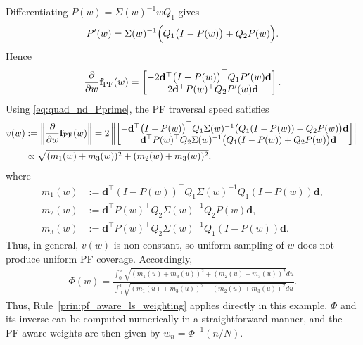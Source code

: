 \documentclass{article}
\newcommand{\bd}{\mathbf{d}}
\newcommand{\f}{\mathbf{f}}
\newcommand{\Farc}{\Phi}
\begin{document}
Differentiating $P(w)=\Sigma(w)^{-1}wQ_1$ gives
\begin{align}
P'(w)
=
\Sigma(w)^{-1}\Bigl(Q_1\bigl(I-P(w)\bigr)+Q_2P(w)\Bigr).
\label{eq:quad_nd_Pprime}
\end{align}
Hence
\begin{align}
\frac{\partial}{\partial w}\f_{\rm PF}(w)
=
\begin{bmatrix}
-2 \bd^\top \bigl(I-P(w)\bigr)^\top Q_1 P'(w)\bd\\
\phantom{-}2 \bd^\top P(w)^\top Q_2 P'(w)\bd
\end{bmatrix}.
\end{align}
Using \eqref{eq:quad_nd_Pprime}, the PF traversal speed satisfies
\begin{align}
v(w)
&:=
\left\|
\frac{\partial}{\partial w}\f_{\rm PF}(w)
\right\| =
2\left\|
\begin{bmatrix}
-\bd^\top \bigl(I-P(w)\bigr)^\top Q_1 \Sigma(w)^{-1}\bigl(Q_1(I-P(w))+Q_2P(w)\bigr)\bd\\
\phantom{-}\bd^\top P(w)^\top Q_2 \Sigma(w)^{-1}\bigl(Q_1(I-P(w))+Q_2P(w)\bigr)\bd
\end{bmatrix}
\right\| \nonumber\\
&\propto
\sqrt{(m_1(w)+m_3(w))^2+(m_2(w)+m_3(w))^2},
\label{eq:quad_nd_speed}
\end{align}
where
\begin{align*}
m_1(w)&:=\bd^\top (I-P(w))^\top Q_1\Sigma(w)^{-1}Q_1(I-P(w))\bd,\\
m_2(w)&:=\bd^\top P(w)^\top Q_2\Sigma(w)^{-1}Q_2P(w)\bd,\\
m_3(w)&:=%
\bd^\top P(w)^\top Q_2\Sigma(w)^{-1}Q_1(I-P(w))\bd .
\end{align*}
Thus, in general, $v(w)$ is non-constant, so uniform sampling of $w$ does not produce uniform PF coverage. Accordingly,
\begin{align}
\Farc(w)=
\frac{\int_0^w \sqrt{(m_1(u)+m_3(u))^2+(m_2(u)+m_3(u))^2} du}
{\int_0^1 \sqrt{(m_1(u)+m_3(u))^2+(m_2(u)+m_3(u))^2} du}.
\end{align}
Thus, Rule~\ref{prin:pf_aware_ls_weighting} applies directly in this example. $\Farc$ and its inverse can be computed numerically in a straightforward manner, and the PF-aware weights are then given by $w_n=\Farc^{-1}(n/N)$.
\end{document}

